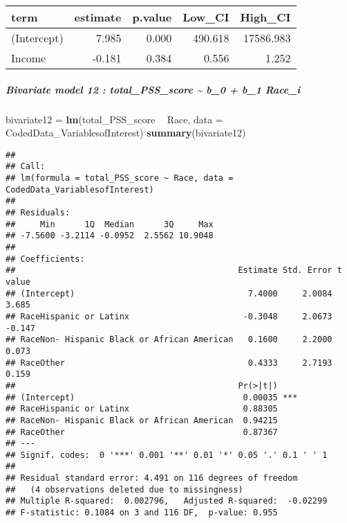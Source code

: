 \documentclass[]{article}
\newenvironment{Shaded}{\begin{snugshade}}{\end{snugshade}}
\newcommand{\DataTypeTok}[1]{\textcolor[rgb]{0.13,0.29,0.53}{#1}}
\newcommand{\KeywordTok}[1]{\textcolor[rgb]{0.13,0.29,0.53}{\textbf{#1}}}
\newcommand{\NormalTok}[1]{#1}
\newcommand{\OperatorTok}[1]{\textcolor[rgb]{0.81,0.36,0.00}{\textbf{#1}}}
\newcommand{\StringTok}[1]{\textcolor[rgb]{0.31,0.60,0.02}{#1}}
\let\oldsubparagraph\subparagraph
\renewcommand{\subparagraph}[1]{\oldsubparagraph{#1}\mbox{}}
\begin{document}
\begin{longtable}[]{@{}lrrrr@{}}
\toprule
term & estimate & p.value & Low\_CI & High\_CI\tabularnewline
\midrule
\endhead
(Intercept) & 7.985 & 0.000 & 490.618 & 17586.983\tabularnewline
Income & -0.181 & 0.384 & 0.556 & 1.252\tabularnewline
\bottomrule
\end{longtable}

\hypertarget{bivariate-model-12-total_pss_score-b_0-b_1-race_i}{%
\subparagraph{Bivariate model 12 : total\_PSS\_score \textasciitilde{}
b\_0 + b\_1
Race\_i}\label{bivariate-model-12-total_pss_score-b_0-b_1-race_i}}

\begin{Shaded}
\begin{Highlighting}[]
\NormalTok{bivariate12 =}\StringTok{ }\KeywordTok{lm}\NormalTok{(total_PSS_score }\OperatorTok{~}\StringTok{ }\NormalTok{Race, }\DataTypeTok{data =}\NormalTok{ CodedData_VariablesofInterest)}
\KeywordTok{summary}\NormalTok{(bivariate12) }
\end{Highlighting}
\end{Shaded}

\begin{verbatim}
## 
## Call:
## lm(formula = total_PSS_score ~ Race, data = CodedData_VariablesofInterest)
## 
## Residuals:
##     Min      1Q  Median      3Q     Max 
## -7.5600 -3.2114 -0.0952  2.5562 10.9048 
## 
## Coefficients:
##                                             Estimate Std. Error t value
## (Intercept)                                   7.4000     2.0084   3.685
## RaceHispanic or Latinx                       -0.3048     2.0673  -0.147
## RaceNon- Hispanic Black or African American   0.1600     2.2000   0.073
## RaceOther                                     0.4333     2.7193   0.159
##                                             Pr(>|t|)    
## (Intercept)                                  0.00035 ***
## RaceHispanic or Latinx                       0.88305    
## RaceNon- Hispanic Black or African American  0.94215    
## RaceOther                                    0.87367    
## ---
## Signif. codes:  0 '***' 0.001 '**' 0.01 '*' 0.05 '.' 0.1 ' ' 1
## 
## Residual standard error: 4.491 on 116 degrees of freedom
##   (4 observations deleted due to missingness)
## Multiple R-squared:  0.002796,   Adjusted R-squared:  -0.02299 
## F-statistic: 0.1084 on 3 and 116 DF,  p-value: 0.955
\end{verbatim}
\end{document}

